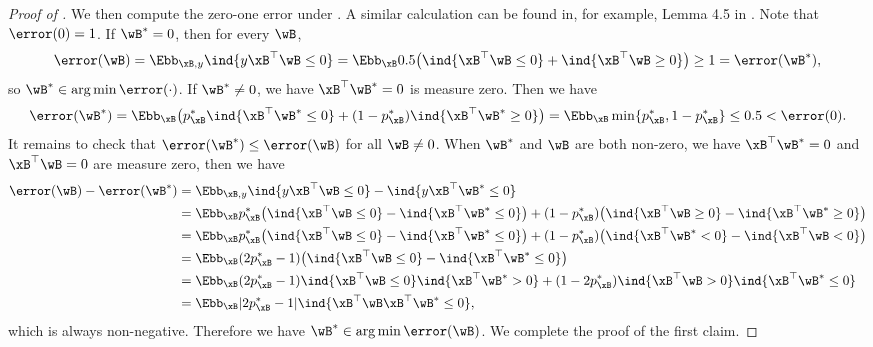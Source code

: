 \documentclass[11pt]{article}
\begin{document}
\begin{proof}[Proof of ]
We then compute the zero-one error under . A similar calculation can be found in, for example, Lemma 4.5 in \citep{mohri2018foundations}.
Note that $\error(0)= 1$.
If $\wB^*=0$, then for every $\wB$,
\begin{align*}
 \error(\wB) = \Ebb_{\xB,y}\ind{y \xB^\top \wB \le 0} 
 = \Ebb_{\xB} 0.5 \big( \ind{\xB^\top \wB \le 0} + \ind{\xB^\top \wB \ge 0}  \big)
 \ge 1 = \error(\wB^*),
\end{align*}
so $\wB^* \in \arg\min\error(\cdot)$.
If $\wB^*\ne 0$, we have $\xB^\top\wB^*=0$ is measure zero. Then we have
\begin{align*}
     \error(\wB^*) = \Ebb_{\xB} \big( p_{\xB}^* \ind{\xB^\top \wB^* \le 0} + (1-p_{\xB}^*) \ind{\xB^\top \wB^* \ge 0} \big) 
     = \Ebb_{\xB} \min\{p_{\xB}^*, 1-p_{\xB}^*\} 
     \le 0.5 < \error (0).
\end{align*}
It remains to check that $\error(\wB^*) \le \error(\wB)$ for all $\wB \ne 0$.
When $\wB^*$ and $\wB$ are both non-zero, we have $\xB^\top\wB^*=0$ and $\xB^\top\wB=0$ are measure zero, 
then we have 
\begin{align*}
    \error(\wB) -\error(\wB^*)
    &= \Ebb_{\xB, y} \ind{y \xB^\top \wB \le 0}-\ind{y \xB^\top \wB^* \le 0} \\
    &= \Ebb_{\xB} p^*_{\xB}\big(  \ind{\xB^\top \wB \le 0} - \ind{\xB^\top \wB^*\le 0} \big) +  (1-p^*_{\xB}) \big( \ind{\xB^\top \wB \ge 0} -\ind{\xB^\top \wB^* \ge 0} \big) \\
    &= \Ebb_{\xB} p^*_{\xB}\big(  \ind{\xB^\top \wB \le 0} - \ind{\xB^\top \wB^*\le 0} \big) +  (1-p^*_{\xB}) \big( \ind{\xB^\top \wB^* < 0} -\ind{\xB^\top \wB < 0} \big) \\ 
    &= \Ebb_{\xB}(2p^*_{\xB}-1) \big( \ind{\xB^\top \wB \le 0} -\ind{\xB^\top \wB^* \le 0} \big) \\
    &= \Ebb_{\xB}(2p^*_{\xB}-1)  \ind{\xB^\top \wB \le 0}\ind{\xB^\top \wB^* > 0} + (1-2p^*_{\xB}) \ind{\xB^\top \wB > 0} \ind{\xB^\top \wB^* \le 0}  \\
    &= \Ebb_{\xB}| 2p^*_{\xB}-1 | \ind{ \xB^\top \wB \xB^\top \wB^*\le 0},
\end{align*}
which is always non-negative. Therefore we have $\wB^* \in \arg\min\error(\wB)$. We complete the proof of the first claim.




\end{proof}
\end{document}
